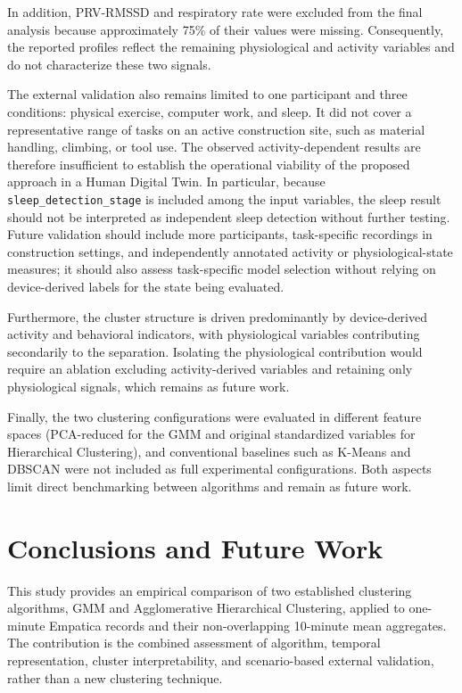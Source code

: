 \documentclass[a4paper,fleqn]{cas-sc}
\newcommand{\newtextblue}[1]{{\color{blue}#1}}
\newcommand{\newtextred}[1]{{\color{yellow!65!black}#1}}
\newcommand{\newtextpurple}[1]{{\color{revpurple}#1}}
\newcommand{\newtextteal}[1]{{\color{revteal}#1}}
\begin{document}
In addition, PRV-RMSSD and respiratory rate were excluded from the final analysis because approximately 75\% of their values were missing. Consequently, the reported profiles reflect the remaining physiological and activity variables and do not characterize these two signals.

\newtextred{The external validation also remains limited to one participant and three conditions: physical exercise, computer work, and sleep. It did not cover a representative range of tasks on an active construction site, such as material handling, climbing, or tool use. The observed activity-dependent results are therefore insufficient to establish the operational viability of the proposed approach in a Human Digital Twin. In particular, because \texttt{sleep\_detection\_stage} is included among the input variables, the sleep result should not be interpreted as independent sleep detection without further testing. Future validation should include more participants, task-specific recordings in construction settings, and independently annotated activity or physiological-state measures; it should also assess task-specific model selection without relying on device-derived labels for the state being evaluated.}

\newtextpurple{Furthermore, the cluster structure is driven predominantly by device-derived activity and behavioral indicators, with physiological variables contributing secondarily to the separation. Isolating the physiological contribution would require an ablation excluding activity-derived variables and retaining only physiological signals, which remains as future work.}

\newtextteal{Finally, the two clustering configurations were evaluated in different feature spaces (PCA-reduced for the GMM and original standardized variables for Hierarchical Clustering), and conventional baselines such as K-Means and DBSCAN were not included as full experimental configurations. Both aspects limit direct benchmarking between algorithms and remain as future work.}

\section{Conclusions and Future Work}\label{sec:conclusions}
\newtextblue{This study provides an empirical comparison of two established clustering algorithms, GMM and Agglomerative Hierarchical Clustering, applied to one-minute Empatica records and their non-overlapping 10-minute mean aggregates. The contribution is the combined assessment of algorithm, temporal representation, cluster interpretability, and scenario-based external validation, rather than a new clustering technique.}
\end{document}
